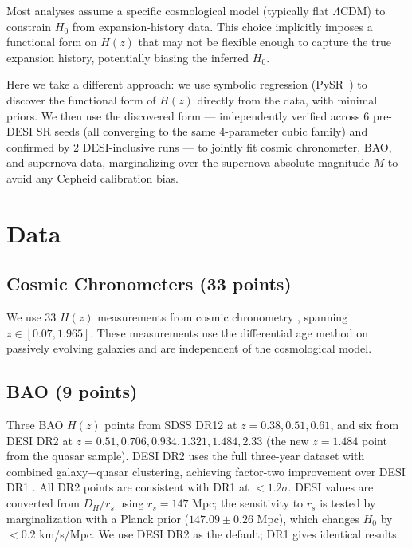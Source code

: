 \documentclass[twocolumn]{aastex631}
\begin{document}
Most analyses assume a specific cosmological model (typically flat
$\Lambda$CDM) to constrain $H_0$ from expansion-history data.  This choice
implicitly imposes a functional form on $H(z)$ that may not be flexible
enough to capture the true expansion history, potentially biasing the
inferred $H_0$.

Here we take a different approach: we use symbolic regression (PySR~\cite{pysr})
to discover the functional form of $H(z)$ directly from the data, with
minimal priors.  We then use the discovered form --- independently verified
across 6 pre-DESI SR seeds (all converging to the same 4-parameter cubic
family) and confirmed by 2 DESI-inclusive runs --- to jointly fit cosmic chronometer,
BAO, and supernova data, marginalizing over the supernova absolute magnitude
$M$ to avoid any Cepheid calibration bias.

\section{Data}

\subsection{Cosmic Chronometers (33 points)}
We use 33 $H(z)$ measurements from cosmic chronometry \cite{cc_data},
spanning $z\in[0.07,1.965]$.  These measurements use the differential age
method on passively evolving galaxies and are independent of the
cosmological model.

\subsection{BAO (9 points)}
Three BAO $H(z)$ points from SDSS DR12 \cite{bao_sdss} at $z=0.38,0.51,0.61$,
and six from DESI DR2 \cite{desi_dr2} at $z=0.51,0.706,0.934,1.321,1.484,2.33$
(the new $z=1.484$ point from the quasar sample).  DESI DR2 uses the full
three-year dataset with combined galaxy+quasar clustering, achieving
factor-two improvement over DESI DR1 \cite{desi2024}.  All DR2 points are
consistent with DR1 at $<1.2\sigma$.  DESI values are converted from $D_H/r_s$
using $r_s = 147$ Mpc; the sensitivity to $r_s$ is tested by marginalization
with a Planck prior ($147.09 \pm 0.26$ Mpc), which changes $H_0$ by
$<0.2$ km/s/Mpc.  We use DESI DR2 as the default; DR1 gives
identical results.
\end{document}
